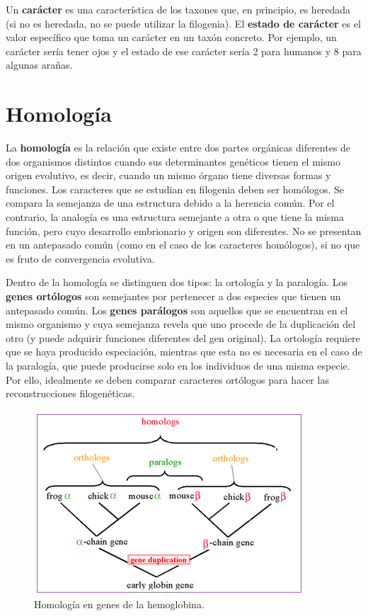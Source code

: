 Un \textbf{carácter} es una característica de los taxones que, en principio, es heredada (si no es heredada, no se puede utilizar la filogenia). El \textbf{estado de carácter} es el valor específico que toma un carácter en un taxón concreto. Por ejemplo, un carácter sería tener ojos y el estado de ese carácter sería 2 para humanos y 8 para algunas arañas.

\section{Homología}
La \textbf{homología} es la relación que existe entre dos partes orgánicas diferentes de dos organismos distintos cuando sus determinantes genéticos tienen el mismo origen evolutivo, es decir, cuando un mismo órgano tiene diversas formas y funciones. Los caracteres que se estudian en filogenia deben ser homólogos. Se compara la semejanza de una estructura debido a la herencia común. Por el contrario, la analogía es una estructura semejante a otra o que tiene la misma función, pero cuyo desarrollo embrionario y origen son diferentes. No se presentan en un antepasado común (como en el caso de los caracteres homólogos), si no que es fruto de convergencia evolutiva.

Dentro de la homología se distinguen dos tipos: la ortología y la paralogía. Los \textbf{genes ortólogos} son semejantes por pertenecer a dos especies que tienen un antepasado común. Los \textbf{genes parálogos} son aquellos que se encuentran en el mismo organismo y cuya semejanza revela que uno procede de la duplicación del otro (y puede adquirir funciones diferentes del gen original). La ortología requiere que se haya producido especiación, mientras que esta no es necesaria en el caso de la paralogía, que puede producirse solo en los individuos de una misma especie. Por ello, idealmente se deben comparar caracteres ortólogos para hacer las reconstrucciones filogenéticas.

\begin{figure}[htbp]
\centering
\includegraphics[width=0.5\linewidth]{figs/ortologos-paralogos.png}
\caption{Homología en genes de la hemoglobina.}
\end{figure}

